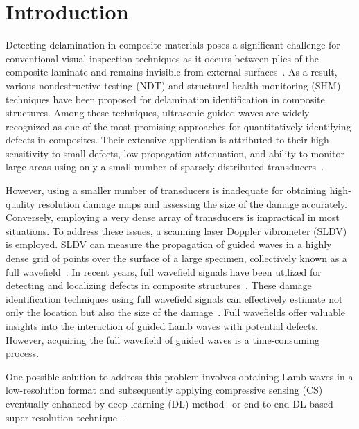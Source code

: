 \section{Introduction}

Detecting delamination in composite materials poses a significant challenge for conventional visual inspection techniques as it occurs between plies of the composite laminate and remains invisible from external surfaces~\cite{staszewski2009health, tuo2019damage}. 
As a result, various nondestructive testing (NDT) and structural health monitoring (SHM) techniques have been proposed for delamination identification in composite structures. 
Among these techniques, ultrasonic guided waves are widely recognized as one of the most promising approaches for quantitatively identifying defects in composites. 
Their extensive application is attributed to their high sensitivity to small defects, low propagation attenuation, and ability to monitor large areas using only a small number of sparsely distributed transducers~\cite{Barthorpe2020, Ihn2008, Cantero-Chinchilla2020}.

However, using a smaller number of transducers is inadequate for obtaining high-quality resolution damage maps and assessing the size of the damage accurately. 
Conversely, employing a very dense array of transducers is impractical in most situations. To address these issues, a scanning laser Doppler vibrometer (SLDV) is employed. 
SLDV can measure the propagation of guided waves in a highly dense grid of points over the surface of a large specimen, collectively known as a full wavefield~\cite{Radzienski2019a}. 
In recent years, full wavefield signals have been utilized for detecting and localizing defects in composite structures~\cite{Radzienski2019a, Girolamo2018a, kudela2018impact, rogge2013characterization}. 
These damage identification techniques using full wavefield signals can effectively estimate 
not only the location but also the size of the damage~\cite{Girolamo2018a, kudela2018impact}. 
Full wavefields offer valuable insights into the interaction of guided Lamb waves with potential defects. However, acquiring the full wavefield of guided waves is a time-consuming process.

One possible solution to address this problem involves obtaining Lamb waves in a low-resolution format and subsequently applying compressive sensing (CS) eventually enhanced by deep learning (DL) method~\cite{esfandabadideep} or end-to-end DL-based super-resolution technique~\cite{ijjeh2023deep}. 

